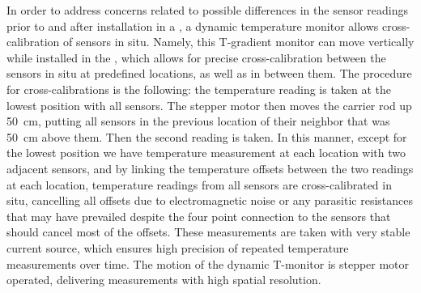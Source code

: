  
 In order to address concerns related to possible differences in the sensor readings prior to %
 and after installation in a , a dynamic temperature monitor allows cross-calibration of sensors in situ. 
 Namely, this T-gradient monitor  can move vertically while installed in the , which allows for precise cross-calibration between the sensors in situ at predefined locations, as well as in between them. 
 The procedure for cross-calibrations is the following: the temperature reading is taken at the lowest position with all sensors. The stepper motor then moves the carrier rod up \SI{50}{cm},  
 putting all sensors in the previous location of their neighbor that was \SI{50}{cm} above them. 
 Then the second reading is taken. In this manner, except for the lowest position we have temperature measurement at each location with two adjacent sensors, and by linking the temperature offsets between the two readings at each location, temperature readings from all sensors are cross-calibrated in situ, cancelling all offsets due to electromagnetic noise or any parasitic resistances that may have prevailed despite the four point connection to the sensors that should cancel most of the offsets. These measurements are taken with very stable current source, which ensures high precision of repeated temperature measurements over time. The motion of the dynamic T-monitor is stepper motor operated, 
delivering measurements with high spatial resolution. 


